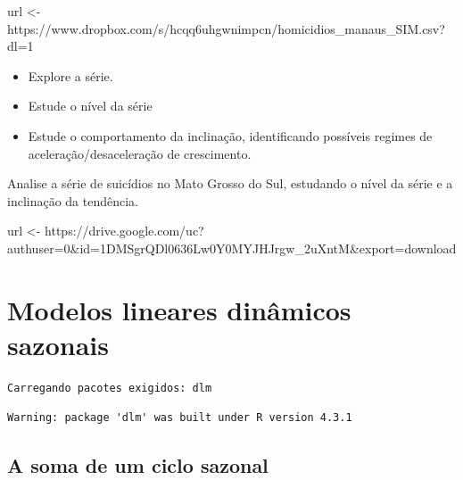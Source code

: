 \documentclass[
  letterpaper,
  DIV=11,
  numbers=noendperiod]{scrreprt}
\newenvironment{Shaded}{\begin{snugshade}}{\end{snugshade}}
\newcommand{\NormalTok}[1]{\textcolor[rgb]{0.00,0.23,0.31}{#1}}
\newcommand{\OtherTok}[1]{\textcolor[rgb]{0.00,0.23,0.31}{#1}}
\newcommand{\StringTok}[1]{\textcolor[rgb]{0.13,0.47,0.30}{#1}}
\begin{document}
\begin{Shaded}
\begin{Highlighting}[]
\NormalTok{url }\OtherTok{\textless{}{-}} \StringTok{\textquotesingle{}https://www.dropbox.com/s/hcqq6uhgwnimpcn/homicidios\_manaus\_SIM.csv?dl=1\textquotesingle{}}
\end{Highlighting}
\end{Shaded}

\begin{itemize}
\item
  Explore a série.
\item
  Estude o nível da série
\item
  Estude o comportamento da inclinação, identificando possíveis regimes
  de aceleração/desaceleração de crescimento.
\end{itemize}

Analise a série de suicídios no Mato Grosso do Sul, estudando o nível da
série e a inclinação da tendência.

\begin{Shaded}
\begin{Highlighting}[]
\NormalTok{url }\OtherTok{\textless{}{-}} \StringTok{\textquotesingle{}https://drive.google.com/uc?authuser=0\&id=1DMSgrQDl0636Lw0Y0MYJHJrgw\_2uXntM\&export=download\textquotesingle{}}
\end{Highlighting}
\end{Shaded}


\hypertarget{modelos-lineares-dinuxe2micos-sazonais}{%
\chapter{Modelos lineares dinâmicos
sazonais}\label{modelos-lineares-dinuxe2micos-sazonais}}

\begin{verbatim}
Carregando pacotes exigidos: dlm
\end{verbatim}

\begin{verbatim}
Warning: package 'dlm' was built under R version 4.3.1
\end{verbatim}

\hypertarget{a-soma-de-um-ciclo-sazonal}{%
\section{A soma de um ciclo sazonal}\label{a-soma-de-um-ciclo-sazonal}}
\end{document}
